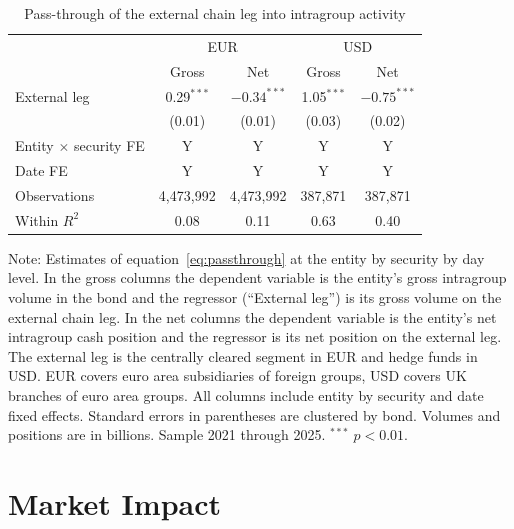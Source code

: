 \documentclass[english, 11pt, oneside, legal]{article}
\begin{document}
\begin{table}[htbp]
    \centering
    \caption{Pass-through of the external chain leg into intragroup activity}
    \label{tab:passthrough}
    \begin{tabular}{lcccc}
        \hline
                                    & \multicolumn{2}{c}{EUR} & \multicolumn{2}{c}{USD} \\
                                    & Gross        & Net           & Gross        & Net           \\
        \hline
        External leg                & 0.29$^{***}$ & $-0.34^{***}$ & 1.05$^{***}$ & $-0.75^{***}$ \\
                                    & (0.01)       & (0.01)        & (0.03)       & (0.02)        \\
        \hline
        Entity $\times$ security FE & Y            & Y             & Y            & Y             \\
        Date FE                     & Y            & Y             & Y            & Y             \\
        Observations                & 4{,}473{,}992 & 4{,}473{,}992 & 387{,}871   & 387{,}871     \\
        Within $R^{2}$              & 0.08         & 0.11          & 0.63         & 0.40          \\
        \hline
    \end{tabular}
    \begin{flushleft}
        \footnotesize Note: Estimates of equation~\eqref{eq:passthrough} at the entity by security by day level. In the gross columns the dependent variable is the entity's gross intragroup volume in the bond and the regressor (``External leg'') is its gross volume on the external chain leg. In the net columns the dependent variable is the entity's net intragroup cash position and the regressor is its net position on the external leg. The external leg is the centrally cleared segment in EUR and hedge funds in USD. EUR covers euro area subsidiaries of foreign groups, USD covers UK branches of euro area groups. All columns include entity by security and date fixed effects. Standard errors in parentheses are clustered by bond. Volumes and positions are in billions. Sample 2021 through 2025. $^{***}$ $p<0.01$.
    \end{flushleft}
\end{table}



\section{Market Impact}
\label{sec:empirics}
\end{document}
